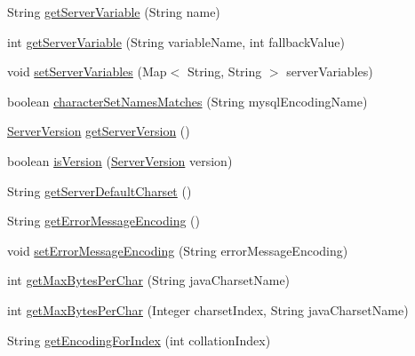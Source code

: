 \begin{DoxyCompactItemize}
\item 
String \mbox{\hyperlink{interfacecom_1_1mysql_1_1cj_1_1protocol_1_1_server_session_aadfc93f89a87bfacef5c66a4033e3bcb}{get\+Server\+Variable}} (String name)
\item 
int \mbox{\hyperlink{interfacecom_1_1mysql_1_1cj_1_1protocol_1_1_server_session_afeb21bb0efebb37bf03081dc2febfa6b}{get\+Server\+Variable}} (String variable\+Name, int fallback\+Value)
\item 
void \mbox{\hyperlink{interfacecom_1_1mysql_1_1cj_1_1protocol_1_1_server_session_a47e9a273ef6de1e09dbacada62650998}{set\+Server\+Variables}} (Map$<$ String, String $>$ server\+Variables)
\item 
boolean \mbox{\hyperlink{interfacecom_1_1mysql_1_1cj_1_1protocol_1_1_server_session_a17bf8c1aa6316e1a1db91c7b00ebee86}{character\+Set\+Names\+Matches}} (String mysql\+Encoding\+Name)
\item 
\mbox{\hyperlink{classcom_1_1mysql_1_1cj_1_1_server_version}{Server\+Version}} \mbox{\hyperlink{interfacecom_1_1mysql_1_1cj_1_1protocol_1_1_server_session_a96ad6ba424e7065b39d9b83dae49834a}{get\+Server\+Version}} ()
\item 
boolean \mbox{\hyperlink{interfacecom_1_1mysql_1_1cj_1_1protocol_1_1_server_session_a021c8f114fce23443b9a8b26074b137a}{is\+Version}} (\mbox{\hyperlink{classcom_1_1mysql_1_1cj_1_1_server_version}{Server\+Version}} version)
\item 
String \mbox{\hyperlink{interfacecom_1_1mysql_1_1cj_1_1protocol_1_1_server_session_afeb928036af67a7fff2d45783673c72d}{get\+Server\+Default\+Charset}} ()
\item 
String \mbox{\hyperlink{interfacecom_1_1mysql_1_1cj_1_1protocol_1_1_server_session_af83c1d2cdc8e37e3c916ee435ff0af71}{get\+Error\+Message\+Encoding}} ()
\item 
void \mbox{\hyperlink{interfacecom_1_1mysql_1_1cj_1_1protocol_1_1_server_session_a05ff2ff3c3265cb245ca9f1ff708d457}{set\+Error\+Message\+Encoding}} (String error\+Message\+Encoding)
\item 
int \mbox{\hyperlink{interfacecom_1_1mysql_1_1cj_1_1protocol_1_1_server_session_a5717509373a607bafcf452136ccd4fe6}{get\+Max\+Bytes\+Per\+Char}} (String java\+Charset\+Name)
\item 
int \mbox{\hyperlink{interfacecom_1_1mysql_1_1cj_1_1protocol_1_1_server_session_a2fb64ef85381ab4a6a7a2c819e5d8a8a}{get\+Max\+Bytes\+Per\+Char}} (Integer charset\+Index, String java\+Charset\+Name)
\item 
String \mbox{\hyperlink{interfacecom_1_1mysql_1_1cj_1_1protocol_1_1_server_session_a437ab4e5fb2cdd6cc66f206bce8688cd}{get\+Encoding\+For\+Index}} (int collation\+Index)

\end{DoxyCompactItemize}
